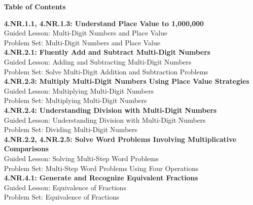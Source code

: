 \documentclass[12pt]{book}
\begin{document}
\begin{center}
    {\LARGE \textbf{Table of Contents}}\\[0.5cm]
\end{center}

\noindent
\textbf{4.NR.1.1, 4.NR.1.3: Understand Place Value to 1,000,000}\\
\hspace*{2em} Guided Lesson: Multi-Digit Numbers and Place Value\\
\hspace*{2em} Problem Set: Multi-Digit Numbers and Place Value\\[0.3cm]

\textbf{4.NR.2.1: Fluently Add and Subtract Multi-Digit Numbers}\\
\hspace*{2em} Guided Lesson: Adding and Subtracting Multi-Digit Numbers\\
\hspace*{2em} Problem Set: Solve Multi-Digit Addition and Subtraction Problems\\[0.3cm]

\textbf{4.NR.2.3: Multiply Multi-Digit Numbers Using Place Value Strategies}\\
\hspace*{2em} Guided Lesson: Multiplying Multi-Digit Numbers\\
\hspace*{2em} Problem Set: Multiplying Multi-Digit Numbers\\[0.3cm]

\textbf{4.NR.2.4: Understanding Division with Multi-Digit Numbers}\\
\hspace*{2em} Guided Lesson: Understanding Division with Multi-Digit Numbers\\
\hspace*{2em} Problem Set: Dividing Multi-Digit Numbers\\[0.3cm]

\textbf{4.NR.2.2, 4.NR.2.5: Solve Word Problems Involving Multiplicative Comparisons}\\
\hspace*{2em} Guided Lesson: Solving Multi-Step Word Problems\\
\hspace*{2em} Problem Set: Multi-Step Word Problems Using Four Operations\\[0.3cm]

\textbf{4.NR.4.1: Generate and Recognize Equivalent Fractions}\\
\hspace*{2em} Guided Lesson: Equivalence of Fractions\\
\hspace*{2em} Problem Set: Equivalence of Fractions\\[0.3cm]

\end{document}
